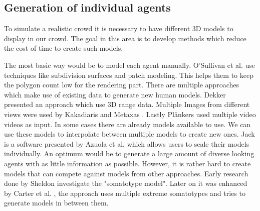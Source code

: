 \documentclass{acmsiggraph}               %
\begin{document}
\subsection{Generation of individual agents}
To simulate a realistic crowd it is necessary to have different 3D models to display in our crowd. The goal in this area is to develop methods which reduce the cost of time to create such models. 

The most basic way would be to model each agent manually. O’Sullivan et al.  use techniques like subdivision surfaces and patch modeling. This helps them to keep the polygon count low for the rendering part.
There are multiple approaches which make use of existing data to generate new human models. Dekker  presented an approach which use 3D range data. Multiple Images from different views were used by Kakadiaris and Metaxas . Lastly Plänkers  used multiple video videos as input.
In some cases there are already models available to use. We can use these models to interpolate between multiple models to create new ones. Jack is a software presented by Azuola et al.  which allows users to scale their models individually.
An optimum would be to generate a large amount of diverse looking agents with as little information as possible. However, it is rather hard to create models that can compete against models from other approaches. Early research done by Sheldon  investigate the "somatotype model". Later on it was enhanced by Carter et al. , the approach uses multiple extreme somatotypes and tries to generate models in between them.
\end{document}
